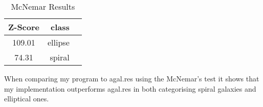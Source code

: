 \documentclass{article}
\begin{document}
\begin{table}[h]
\caption{McNemar Results}
\centering
\begin{tabular}{c rr}
\hline \hline
Z-Score & class \\[0.5ex]
\hline
109.01 & ellipse \\
74.31 & spiral \\
\hline
\end{tabular}
\end{table}

When comparing my program to agal.res using the McNemar's test it shows that my implementation outperforms agal.res in both categorising spiral galaxies and elliptical ones. 
\end{document}
